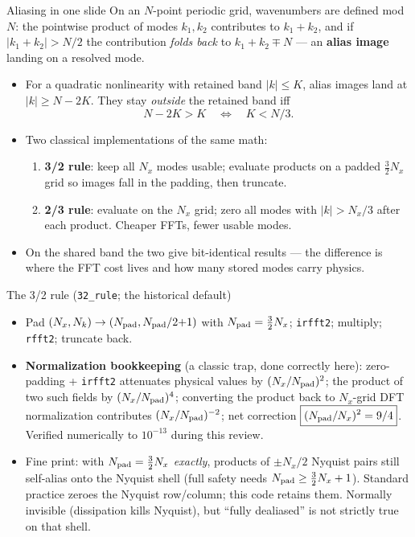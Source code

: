 \documentclass[aspectratio=169,10pt]{beamer}
\begin{document}
\begin{frame}{Aliasing in one slide}
  On an $N$-point periodic grid, wavenumbers are defined mod $N$: the pointwise
  product of modes $k_1,k_2$ contributes to $k_1+k_2$, and if $|k_1+k_2|>N/2$
  the contribution \emph{folds back} to $k_1+k_2\mp N$ --- an \textbf{alias image}
  landing on a resolved mode.
  \begin{itemize}
    \item For a quadratic nonlinearity with retained band $|k|\le K$, alias images
      land at $|k| \ge N - 2K$. They stay \emph{outside} the retained band iff
      \[
        N - 2K > K \quad\Longleftrightarrow\quad K < N/3 .
      \]
    \item Two classical implementations of the same math:
      \begin{enumerate}
        \item \textbf{3/2 rule}: keep all $N_x$ modes usable; evaluate products on a
          padded $\tfrac32 N_x$ grid so images fall in the padding, then truncate.
        \item \textbf{2/3 rule}: evaluate on the $N_x$ grid; zero all modes with
          $|k|>N_x/3$ after each product. Cheaper FFTs, fewer usable modes.
      \end{enumerate}
    \item On the shared band the two give bit-identical results --- the difference is
      where the FFT cost lives and how many stored modes carry physics.
  \end{itemize}
\end{frame}

\begin{frame}{The 3/2 rule (\texttt{32\_rule}; the historical default)}
  \begin{itemize}
    \item Pad $(N_x,N_k) \to (N_{\rm pad}, N_{\rm pad}/2{+}1)$ with
      $N_{\rm pad} = \tfrac32 N_x$; \texttt{irfft2}; multiply; \texttt{rfft2};
      truncate back.
    \item \textbf{Normalization bookkeeping} (a classic trap, done correctly here):
      zero-padding + \texttt{irfft2} attenuates physical values by
      $(N_x/N_{\rm pad})^2$; the product of two such fields by
      $(N_x/N_{\rm pad})^4$; converting the product back to $N_x$-grid DFT
      normalization contributes $(N_x/N_{\rm pad})^{-2}$; net correction
      $\boxed{(N_{\rm pad}/N_x)^2 = 9/4}$.
      Verified numerically to $10^{-13}$ during this review.
    \item Fine print: with $N_{\rm pad}=\tfrac32 N_x$ \emph{exactly}, products of
      $\pm N_x/2$ Nyquist pairs still self-alias onto the Nyquist shell (full safety
      needs $N_{\rm pad}\ge \tfrac32 N_x + 1$). Standard practice zeroes the Nyquist
      row/column; this code retains them. Normally invisible (dissipation kills
      Nyquist), but ``fully dealiased'' is not strictly true on that shell.
  \end{itemize}
\end{frame}
\end{document}
